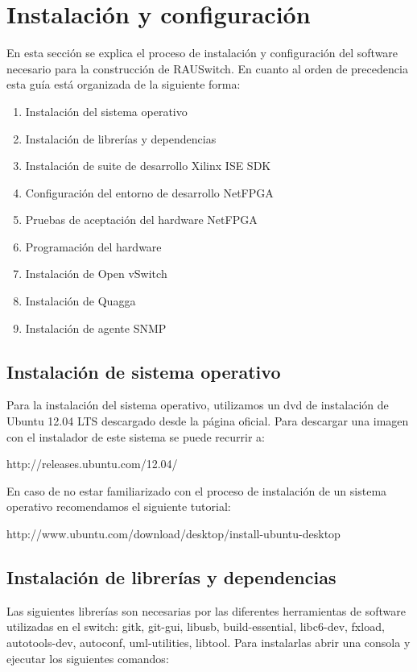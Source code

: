 \newpage
\section{Instalación y configuración}
En esta sección se explica el proceso de instalación y configuración del software necesario para la construcción de RAUSwitch. En cuanto al orden de precedencia esta guía está organizada de la siguiente forma:

\begin{enumerate}
\item Instalación del sistema operativo
\item Instalación de librerías y dependencias
\item Instalación de suite de desarrollo Xilinx ISE SDK
\item Configuración del entorno de desarrollo NetFPGA
\item Pruebas de aceptación del hardware NetFPGA
\item Programación del hardware
\item Instalación de Open vSwitch
\item Instalaci\'on de Quagga
\item Instalaci\'on de agente SNMP
\end{enumerate}

\subsection{Instalación de sistema operativo}
Para la instalaci\'on del sistema operativo, utilizamos un dvd de instalaci\'on de Ubuntu 12.04 LTS descargado desde la p\'agina oficial. Para descargar una imagen con el instalador de este sistema se puede recurrir a:

\begin{center}
http://releases.ubuntu.com/12.04/
\end{center}  

En caso de no estar familiarizado con el proceso de instalación de un sistema operativo recomendamos el siguiente tutorial:

\begin{center}
http://www.ubuntu.com/download/desktop/install-ubuntu-desktop
\end{center}

\subsection{Instalación de librerías y dependencias}
Las siguientes librerías son necesarias por las diferentes herramientas de software utilizadas en el switch: gitk, git-gui, libusb, build-essential, libc6-dev, fxload, autotools-dev, autoconf, uml-utilities, libtool. Para instalarlas abrir una consola y ejecutar los siguientes comandos:

